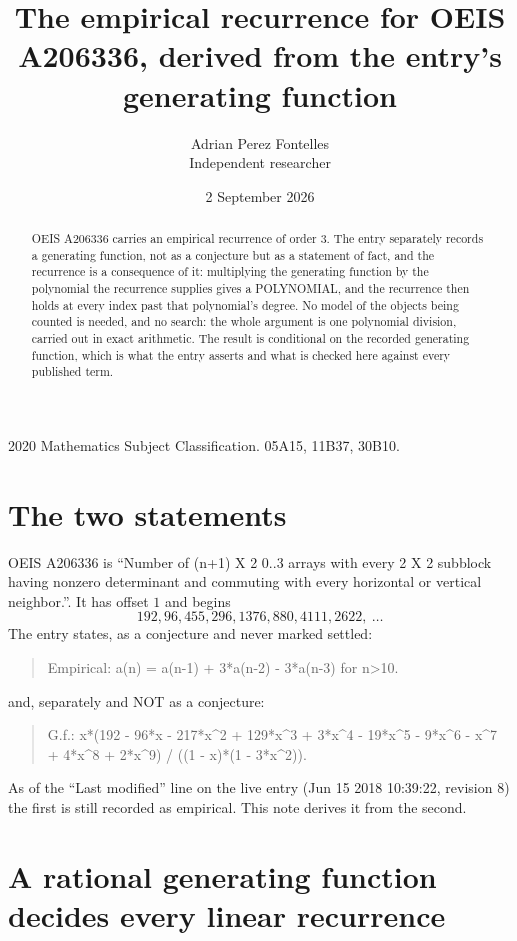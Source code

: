 \documentclass[11pt,a4paper]{article}
\title{The empirical recurrence for OEIS A206336, derived from the entry's generating function}
\author{Adrian Perez Fontelles\\ \small Independent researcher}
\date{2 September 2026}
\theoremstyle{plain}
\theoremstyle{definition}
\begin{document}
\maketitle

\begin{abstract}
OEIS A206336 carries an empirical recurrence of order $3$. The entry separately records a
generating function, not as a conjecture but as a statement of fact, and the recurrence is a
consequence of it: multiplying the generating function by the polynomial the recurrence
supplies gives a POLYNOMIAL, and the recurrence then holds at every index past that
polynomial's degree. No model of the objects being counted is needed, and no search: the
whole argument is one polynomial division, carried out in exact arithmetic. The result is
conditional on the recorded generating function, which is what the entry asserts and what is
checked here against every published term.
\end{abstract}

\noindent\small 2020 Mathematics Subject Classification. 05A15, 11B37, 30B10.\normalsize

\section{The two statements}

OEIS A206336 is ``Number of (n+1) X 2 0..3 arrays with every 2 X 2 subblock having nonzero determinant and commuting with every horizontal or vertical neighbor.''. It has offset $1$ and begins
\[
192, 96, 455, 296, 1376, 880, 4111, 2622,\ \dots
\]
The entry states, as a conjecture and never marked settled:
\begin{quote}
Empirical: a(n) = a(n-1) + 3*a(n-2) - 3*a(n-3) for n>10.
\end{quote}
and, separately and NOT as a conjecture:
\begin{quote}
G.f.: x*(192 - 96*x - 217*x\^{}2 + 129*x\^{}3 + 3*x\^{}4 - 19*x\^{}5 - 9*x\^{}6 - x\^{}7 + 4*x\^{}8 + 2*x\^{}9) / ((1 - x)*(1 - 3*x\^{}2)).
\end{quote}
As of the ``Last modified'' line on the live entry (Jun 15 2018 10:39:22, revision 8) the first is still
recorded as empirical. This note derives it from the second.

\section{A rational generating function decides every linear recurrence}
\end{document}

